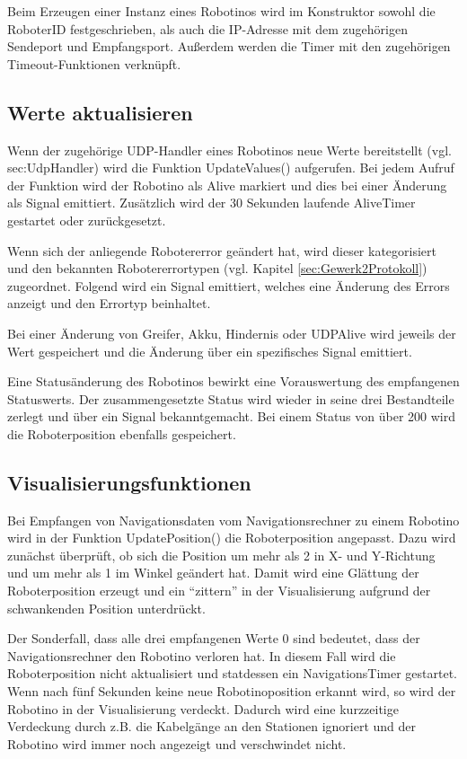 Beim Erzeugen einer Instanz eines Robotinos wird im Konstruktor sowohl die RoboterID festgeschrieben, als auch die IP-Adresse mit dem zugehörigen Sendeport und Empfangsport. Außerdem werden die Timer mit den zugehörigen Timeout-Funktionen verknüpft.

\subsection{Werte aktualisieren}

Wenn der zugehörige UDP-Handler eines Robotinos neue Werte bereitstellt (vgl. sec:UdpHandler) wird die Funktion UpdateValues() aufgerufen. Bei jedem Aufruf der Funktion wird der Robotino als Alive markiert und dies bei einer Änderung als Signal emittiert. Zusätzlich wird der 30 Sekunden laufende AliveTimer gestartet oder zurückgesetzt. 

Wenn sich der anliegende Robotererror geändert hat, wird dieser kategorisiert und den bekannten Robotererrortypen (vgl. Kapitel \ref{sec:Gewerk2Protokoll}) zugeordnet. Folgend wird ein Signal emittiert, welches eine Änderung des Errors anzeigt und den Errortyp beinhaltet.

Bei einer Änderung von Greifer, Akku, Hindernis oder UDPAlive wird jeweils der Wert gespeichert und die Änderung über ein spezifisches Signal emittiert. 

Eine Statusänderung des Robotinos bewirkt eine Vorauswertung des empfangenen Statuswerts. Der zusammengesetzte Status wird wieder in seine drei Bestandteile zerlegt und über ein Signal bekanntgemacht. Bei einem Status von über 200 wird die Roboterposition ebenfalls gespeichert. 

\subsection{Visualisierungsfunktionen}

Bei Empfangen von Navigationsdaten vom Navigationsrechner zu einem Robotino wird in der Funktion UpdatePosition() die Roboterposition angepasst. Dazu wird zunächst überprüft, ob sich die Position um mehr als 2 in X- und Y-Richtung und um mehr als 1 im Winkel geändert hat. Damit wird eine Glättung der Roboterposition erzeugt und ein "`zittern"' in der Visualisierung aufgrund der schwankenden Position unterdrückt. 

Der Sonderfall, dass alle drei empfangenen Werte 0 sind bedeutet, dass der Navigationsrechner den Robotino verloren hat. In diesem Fall wird die Roboterposition nicht aktualisiert und statdessen ein NavigationsTimer gestartet. Wenn nach fünf Sekunden keine neue Robotinoposition erkannt wird, so wird der Robotino in der Visualisierung verdeckt. Dadurch wird eine kurzzeitige Verdeckung durch z.B. die Kabelgänge an den Stationen ignoriert und der Robotino wird immer noch angezeigt und verschwindet nicht.

